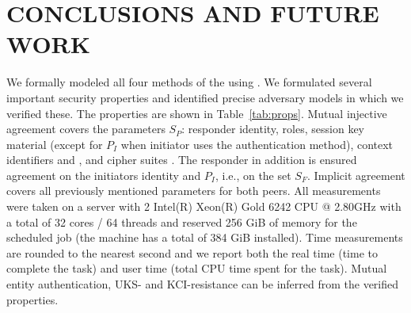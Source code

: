 \documentclass[runningheads]{llncs}
\begin{document}
\section{\uppercase{Conclusions and Future Work}}
\label{sec:conclusion}
We formally modeled all four
methods of the \mEdhoc{} \mSpec{} using \mTamarin.
%
We formulated several important security properties and identified precise
adversary models in which we verified these.
%
The properties are shown in Table~\ref{tab:props}.
%
Mutual injective agreement covers the parameters $S_P$:
responder identity, roles, session key material (except for $P_I$ when
initiator uses the \mStat{} authentication
method), context identifiers \mCi{} and \mCr, and cipher suites \mSuites.
%
The responder in addition is ensured agreement on the initiators identity and
$P_I$, i.e., on the set $S_F$.
%
Implicit agreement covers all previously mentioned parameters for both 
peers.
%
All measurements were taken on a server with 2 Intel(R) Xeon(R) Gold
6242 CPU @ 2.80GHz with a total of 32 cores / 64 threads and reserved
256 GiB of memory for the scheduled job (the machine has a total of
384 GiB installed).
%
Time measurements are rounded to the nearest second and we report both
the real time (time to complete the task) and user time (total CPU time
spent for the task).
%
Mutual entity authentication, UKS- and KCI-resistance can be inferred
from the verified properties.
%
\end{document}
